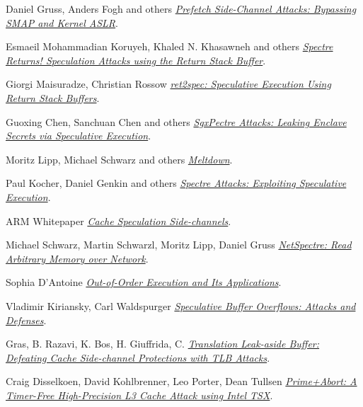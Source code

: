 \begin{frame}[allowframebreaks]
\begin{thebibliography}{10}
    Daniel Gruss, Anders Fogh and others
    \newblock \href{https://gruss.cc/files/prefetch.pdf}{\em Prefetch Side-Channel Attacks: Bypassing SMAP and Kernel ASLR}.

    Esmaeil Mohammadian Koruyeh, Khaled N. Khasawneh and others
    \newblock \href{https://arxiv.org/abs/1807.07940}{\em Spectre Returns! Speculation Attacks using the Return Stack Buffer}.

    Giorgi Maisuradze, Christian Rossow
    \newblock \href{https://christian-rossow.de/publications/ret2spec-ccs2018.pdf}{\em ret2spec: Speculative Execution Using Return Stack Buffers}.

    Guoxing Chen, Sanchuan Chen and others
    \newblock \href{https://arxiv.org/abs/1802.09085}{\em SgxPectre Attacks: Leaking Enclave Secrets via Speculative Execution}.

    Moritz Lipp, Michael Schwarz and others
    \newblock \href{https://meltdownattack.com/meltdown.pdf}{\em Meltdown}.

    Paul Kocher, Daniel Genkin and others
    \newblock \href{https://spectreattack.com/spectre.pdf}{\em Spectre Attacks: Exploiting Speculative Execution}.

    ARM Whitepaper
    \newblock \href{https://developer.arm.com/support/security-update/download-the-whitepaper}{\em Cache Speculation Side-channels}.

    Michael Schwarz, Martin Schwarzl, Moritz Lipp, Daniel Gruss
    \newblock \href{https://misc0110.net/web/files/netspectre.pdf}{\em NetSpectre: Read Arbitrary Memory over Network}.

    Sophia D'Antoine
    \newblock \href{https://deepsec.net/docs/Slides/2017/Out-Of-Order_Execution_and_its_applications_Sophia_dAntoine.pdf}{\em Out-of-Order Execution and Its Applications}.

    Vladimir Kiriansky, Carl Waldspurger
    \newblock \href{https://people.csail.mit.edu/vlk/spectre11.pdf}{\em Speculative Buffer Overflows: Attacks and Defenses}.

    Gras, B. Razavi, K. Bos, H. Giuffrida, C.
    \newblock \href{https://www.vusec.net/projects/tlbleed/}{\em Translation Leak-aside Buffer: Defeating Cache Side-channel Protections with TLB Attacks}.

    Craig Disselkoen, David Kohlbrenner, Leo Porter, Dean Tullsen
    \newblock \href{https://www.usenix.org/conference/usenixsecurity17/technical-sessions/presentation/disselkoen}{\em Prime+Abort: A Timer-Free High-Precision L3 Cache Attack using Intel TSX}.


\end{thebibliography}
\end{frame}
